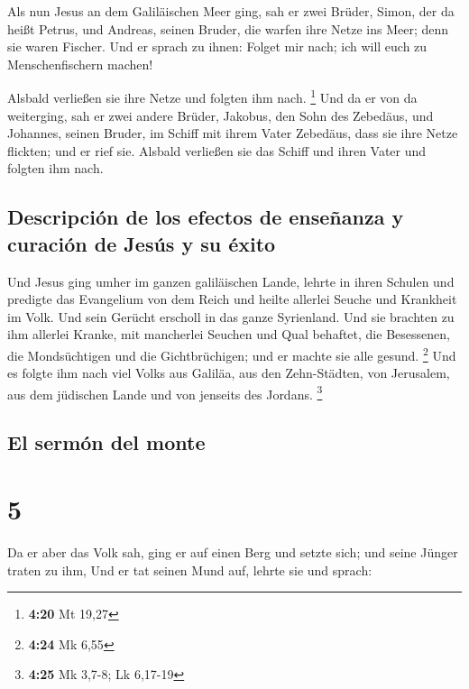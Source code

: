  Als nun Jesus an dem Galiläischen Meer ging, sah er zwei
Brüder, Simon, der da heißt Petrus, und Andreas, seinen Bruder, die
warfen ihre Netze ins Meer; denn sie waren Fischer.  Und
er sprach zu ihnen: Folget mir nach; ich will euch zu Menschenfischern
machen!

 Alsbald verließen sie ihre Netze und folgten ihm nach.
\footnote{\textbf{4:20} Mt 19,27}  Und da er von da
weiterging, sah er zwei andere Brüder, Jakobus, den Sohn des Zebedäus,
und Johannes, seinen Bruder, im Schiff mit ihrem Vater Zebedäus, dass
sie ihre Netze flickten; und er rief sie.  Alsbald
verließen sie das Schiff und ihren Vater und folgten ihm nach.

\hypertarget{descripciuxf3n-de-los-efectos-de-enseuxf1anza-y-curaciuxf3n-de-jesuxfas-y-su-uxe9xito}{%
\subsection{Descripción de los efectos de enseñanza y curación de Jesús
y su
éxito}\label{descripciuxf3n-de-los-efectos-de-enseuxf1anza-y-curaciuxf3n-de-jesuxfas-y-su-uxe9xito}}

 Und Jesus ging umher im ganzen galiläischen Lande,
lehrte in ihren Schulen und predigte das Evangelium von dem Reich und
heilte allerlei Seuche und Krankheit im Volk.  Und sein
Gerücht erscholl in das ganze Syrienland. Und sie brachten zu ihm
allerlei Kranke, mit mancherlei Seuchen und Qual behaftet, die
Besessenen, die Mondsüchtigen und die Gichtbrüchigen; und er machte sie
alle gesund. \footnote{\textbf{4:24} Mk 6,55}  Und es
folgte ihm nach viel Volks aus Galiläa, aus den Zehn-Städten, von
Jerusalem, aus dem jüdischen Lande und von jenseits des Jordans.
\footnote{\textbf{4:25} Mk 3,7-8; Lk 6,17-19}

\hypertarget{el-sermuxf3n-del-monte}{%
\subsection{El sermón del monte}\label{el-sermuxf3n-del-monte}}

\hypertarget{section-4}{%
\section{5}\label{section-4}}

 Da er aber das Volk sah, ging er auf einen Berg und
setzte sich; und seine Jünger traten zu ihm,  Und er tat
seinen Mund auf, lehrte sie und sprach:


